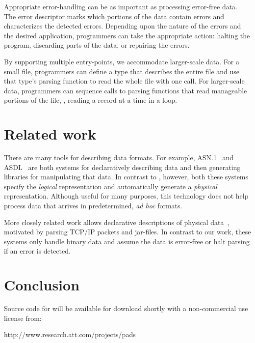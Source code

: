 \documentclass[10pt]{article}
\begin{document}
Appropriate error-handling can be as important as processing
error-free data.  The error descriptor marks which portions of the
data contain errors and characterizes the detected errors.
Depending upon the nature of the errors and the desired application,
programmers can take the appropriate action: halting the program,
discarding parts of the data, or repairing the errors.

By supporting multiple entry-points, we accommodate larger-scale data.
For a small file, programmers can define a \padsl{} type that describes
the entire file and use that type's parsing function to read the whole
file with one call.  For larger-scale data, programmers can sequence
calls to parsing functions that read manageable portions of the file,
\eg{}, reading a record at a time in a loop.

\smallerend{}
\section{Related work}
\smallersp
There are many tools for describing data formats. For example,
\textsc{ASN.1}~\cite{asn} and \textsc{ASDL}~\cite{asdl} are both
systems for declaratively describing data and then generating
libraries for manipulating that data.  In contrast to \pads{},
however, both these systems specify the {\em logical\/} representation
and automatically generate a {\em physical\/} representation.
Although useful for many purposes, this technology does not help
process data that arrives in predetermined, \textit{ad hoc} formats.


More closely related work allows declarative descriptions of physical
data~\cite{sigcomm00,erlang-bit-syntax,gpce02}, motivated by parsing
\textsc{TCP/IP} packets and \java{} jar-files.  In contrast to our
work, these systems only handle binary data and assume the data is
error-free or halt parsing if an error is detected.  

\smallerend{}
\section{Conclusion}
\smallersp
Source code for \pads{} will be available for download shortly with
a non-commercial use license from: 
\begin{centercode}
http://www.research.att.com/projects/pads
\end{centercode}
 

\end{document}
